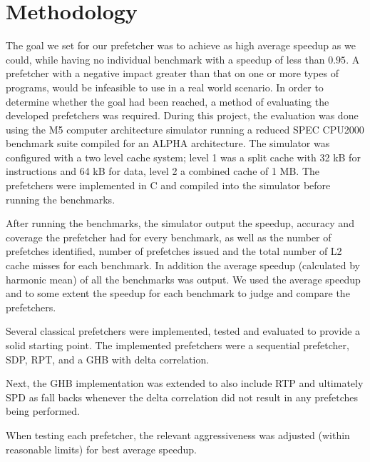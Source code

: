 \section{Methodology}
\label{sec:methodology}

The goal we set for our prefetcher was to achieve as high average speedup as we could, while having no individual benchmark with a speedup of less than $0.95$.
A prefetcher with a negative impact greater than that on one or more types of programs, would be infeasible to use in a real world scenario.
In order to determine whether the goal had been reached, a method of evaluating the developed prefetchers was required.
During this project, the evaluation was done using the M5 computer architecture simulator running a reduced SPEC CPU2000 benchmark suite compiled for an ALPHA architecture.
The simulator was configured with a two level cache system; level 1 was a split cache with 32 kB for instructions and 64 kB for data, level 2 a combined cache of 1 MB.
The prefetchers were implemented in C and compiled into the simulator before running the benchmarks.

After running the benchmarks, the simulator output the speedup, accuracy and coverage the prefetcher had for every benchmark, as well as the number of prefetches identified,
number of prefetches issued and the total number of L2 cache misses for each benchmark. In addition the average speedup (calculated by harmonic mean) of all the benchmarks
was output. We used the average speedup and to some extent the speedup for each benchmark to judge and compare the prefetchers.

Several classical prefetchers were implemented, tested and evaluated to provide a solid starting point.
The implemented prefetchers were a sequential prefetcher, SDP, RPT, and a GHB with delta correlation.

Next, the GHB implementation was extended to also include RTP and ultimately SPD as fall backs whenever the delta correlation did not result in any prefetches being performed.

When testing each prefetcher, the relevant aggressiveness was adjusted (within reasonable limits) for best average speedup.
